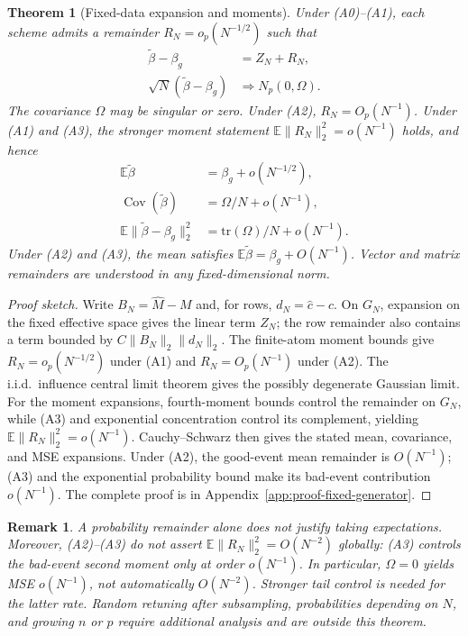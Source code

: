 \documentclass[pdflatex,iicol,sn-mathphys-ay]{sn-jnl}
\theoremstyle{thmstyleone}
\newtheorem{theorem}{Theorem}
\theoremstyle{thmstylethree}
\theoremstyle{thmstyletwo}
\newtheorem{remark}{Remark}
\newcommand{\tr}{\mathrm{tr}}
\newcommand{\E}{\mathbb E}
\begin{document}
\begin{theorem}[Fixed-data expansion and moments]\label{thm:fixed_generator}
Under (A0)--(A1), each scheme admits a remainder $R_N=o_p(N^{-1/2})$ such that
\[
 \begin{aligned}
 \widetilde\beta-\beta_g&=Z_N+R_N,\\
 \sqrt N(\widetilde\beta-\beta_g)&\Longrightarrow N_p(0,\Omega).
 \end{aligned}
\]
The covariance $\Omega$ may be singular or zero.
Under (A2), $R_N=O_p(N^{-1})$.
Under (A1) and (A3), the stronger moment statement
$\E\|R_N\|_2^2=o(N^{-1})$ holds, and hence
\begin{align*}
 \E\widetilde\beta&=\beta_g+o(N^{-1/2}),\\
 \operatorname{Cov}(\widetilde\beta)&=\Omega/N+o(N^{-1}),\\
 \E\|\widetilde\beta-\beta_g\|_2^2
     &=\tr(\Omega)/N+o(N^{-1}). 
\end{align*}
Under (A2) and (A3), the mean satisfies
$\E\widetilde\beta=\beta_g+O(N^{-1})$.
Vector and matrix remainders are understood in any fixed-dimensional norm.
\end{theorem}
\begin{proof}[Proof sketch]
Write $B_N=\widehat M-M$ and, for rows, $d_N=\widehat c-c$.
On $G_N$, expansion on the fixed effective space gives the linear term
$Z_N$; the row remainder also contains a term bounded by
$C\|B_N\|_2\|d_N\|_2$.
The finite-atom moment bounds give $R_N=o_p(N^{-1/2})$ under (A1)
and $R_N=O_p(N^{-1})$ under (A2).
The i.i.d.\ influence central limit theorem gives the possibly degenerate
Gaussian limit.
For the moment expansions, fourth-moment bounds control the remainder on $G_N$,
while (A3) and exponential concentration control its complement, yielding
$\E\|R_N\|_2^2=o(N^{-1})$.
Cauchy--Schwarz then gives the stated mean, covariance, and MSE expansions.
Under (A2), the good-event mean remainder is $O(N^{-1})$; (A3) and the
exponential probability bound make its bad-event contribution $o(N^{-1})$.
The complete proof is in Appendix~\ref{app:proof-fixed-generator}.
\end{proof}

\begin{remark}\label{rem:fixed_moment_scope}
A probability remainder alone does not justify taking expectations.
Moreover, (A2)--(A3) do not assert $\E\|R_N\|_2^2=O(N^{-2})$ globally:
(A3) controls the bad-event second moment only at order $o(N^{-1})$.
In particular, $\Omega=0$ yields MSE $o(N^{-1})$, not automatically
$O(N^{-2})$. Stronger tail control is needed for the latter rate.
Random retuning after subsampling, probabilities depending on $N$, and
growing $n$ or $p$ require additional analysis and are outside this theorem.
\end{remark}
\end{document}
